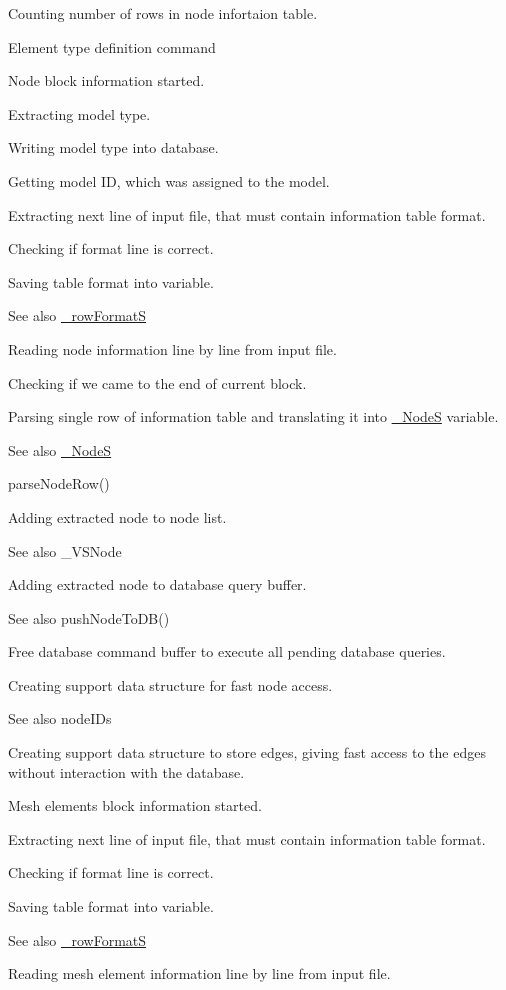 Counting number of rows in node infortaion table.

Element type definition command

Node block information started.

Extracting model type.

Writing model type into database.

Getting model ID, which was assigned to the model.

Extracting next line of input file, that must contain information table format.

Checking if format line is correct.

Saving table format into variable. \begin{DoxySeeAlso}{See also}
\hyperlink{struct__row_format_s}{\+\_\+row\+FormatS}
\end{DoxySeeAlso}
Reading node information line by line from input file.

Checking if we came to the end of current block.

Parsing single row of information table and translating it into \hyperlink{struct___node_s}{\+\_\+\+NodeS} variable. \begin{DoxySeeAlso}{See also}
\hyperlink{struct___node_s}{\+\_\+\+NodeS} 

parse\+Node\+Row()
\end{DoxySeeAlso}
Adding extracted node to node list. \begin{DoxySeeAlso}{See also}
\+\_\+\+V\+S\+Node
\end{DoxySeeAlso}
Adding extracted node to database query buffer. \begin{DoxySeeAlso}{See also}
push\+Node\+To\+D\+B()
\end{DoxySeeAlso}
Free database command buffer to execute all pending database queries.

Creating support data structure for fast node access. \begin{DoxySeeAlso}{See also}
node\+I\+Ds
\end{DoxySeeAlso}
Creating support data structure to store edges, giving fast access to the edges without interaction with the database.

Mesh elements block information started.

Extracting next line of input file, that must contain information table format.

Checking if format line is correct.

Saving table format into variable. \begin{DoxySeeAlso}{See also}
\hyperlink{struct__row_format_s}{\+\_\+row\+FormatS}
\end{DoxySeeAlso}
Reading mesh element information line by line from input file.

